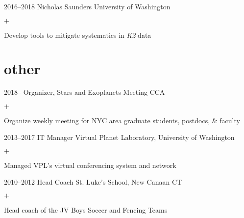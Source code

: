 \documentclass[]{luger-cv} %
\begin{document}
\begin{entrylist}
        \entry
        {2016--2018}
        {Nicholas Saunders}
        {University of Washington}
        {%
            \vspace{-1em}
            \begin{list}{$+$}{\cvlist}
                \item Develop tools to mitigate systematics in \emph{K2} data
            \end{list}
        }


    \end{entrylist}
\fi


\ifdefined \withother

    \section{other}
    \begin{entrylist}


        \entry
        {2018--}
        {Organizer, Stars and Exoplanets Meeting}
        {CCA}
        {%
            \vspace{-1em}
            \begin{list}{$+$}{\cvlist}
                \item Organize weekly meeting for NYC area graduate students, postdocs, \& faculty
            \end{list}
        }


        \entry
        {2013--2017}
        {IT Manager}
        {Virtual Planet Laboratory, University of Washington}
        {%
            \vspace{-1em}
            \begin{list}{$+$}{\cvlist}
                \item Managed VPL's virtual conferencing system and network
            \end{list}
        }


        \entry
        {2010--2012}
        {Head Coach}
        {St. Luke's School, New Canaan CT}
        {%
            \vspace{-1em}
            \begin{list}{$+$}{\cvlist}
                \item Head coach of the JV Boys Soccer and Fencing Teams
            \end{list}
        }


    \end{entrylist}
\fi
\end{document}
